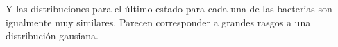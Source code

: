 \documentclass[12pt]{article}
\numberwithin{equation}{section}
\begin{document}
\begin{figure}[!ht]
\begin{floatrow}
\end{floatrow}
\FloatBarrier
\end{figure}
\FloatBarrier
Y las distribuciones para el último estado para cada una de las bacterias son igualmente muy similares. Parecen corresponder a grandes rasgos a una distribución gausiana.\\
\end{document}
